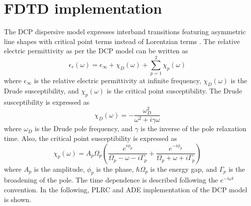 \section{FDTD implementation}
\label{sec:d2cp}
The DCP dispersive model expresses interband transitions featuring asymmetric line shapes with critical point terms instead of Lorentzian terms \cite{etchegoin_analytic_2006}. The relative electric permittivity as per the DCP model can be written as
\begin{equation}
\epsilon_r(\omega) = \epsilon_\infty + \chi_D(\omega) + \sum_{p=1}^2 \chi_p(\omega)
\label{eq:dcp}
\end{equation}
where $\epsilon_\infty$ is the relative electric permittivity at infinite frequency, $\chi_D(\omega)$ is the Drude susceptibility, and $\chi_p(\omega)$ is the critical point susceptibility. The Drude susceptibility is expressed as
\begin{equation}
\chi_D(\omega) = - \frac{\omega_D^2}{\omega^2 + i \gamma \omega}
\label{eq:drude}
\end{equation}
where $\omega_D$ is the Drude pole frequency, and $\gamma$ is the inverse of the pole relaxation time. Also, the critical point susceptibility is expressed as
\begin{equation}
\chi_p(\omega) = A_p \Omega_p \left ( \frac{e^{i\phi_p}}{\Omega_p - \omega -i \Gamma_p} + \frac{e^{-i \phi_p}}{\Omega_p + \omega + i \Gamma_p} \right )
\label{eq:cp}
\end{equation}
where $A_p$ is the amplitude, $\phi_p$ is the phase, $\hbar\Omega_p$ is the energy gap, and $\Gamma_p$ is the broadening of the pole. The time dependence is described following the $e^{-i \omega t}$ convention. In the following, PLRC and ADE implementation of the DCP model is shown.

